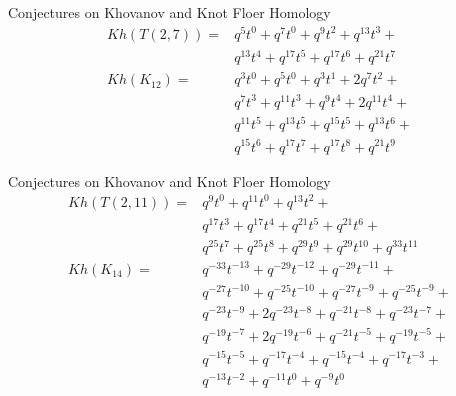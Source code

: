 \documentclass{beamer}
\begin{document}
    \begin{frame}{Conjectures on Khovanov and Knot Floer Homology}
        \begin{align}
            Kh(T(2,7))=&q^{5}t^{0}+q^{7}t^{0}+q^{9}t^{2}+q^{13}t^{3}+\nonumber\\
                &q^{13}t^{4}+q^{17}t^{5}+q^{17}t^{6}+q^{21}t^{7}\\
            Kh(K_{12})=&q^{3}t^{0}+q^{5}t^{0}+q^{3}t^{1}+2q^{7}t^{2}+\nonumber\\
                &q^{7}t^{3}+q^{11}t^{3}+q^{9}t^{4}+2q^{11}t^{4}+\nonumber\\
                &q^{11}t^{5}+q^{13}t^{5}+q^{15}t^{5}+q^{13}t^{6}+\nonumber\\
                &q^{15}t^{6}+q^{17}t^{7}+q^{17}t^{8}+q^{21}t^{9}
        \end{align}
    \end{frame}
    \begin{frame}{Conjectures on Khovanov and Knot Floer Homology}
        \begin{align}
            Kh(T(2,11))=&q^{9}t^{0}+q^{11}t^{0}+q^{13}t^{2}+\nonumber\\
                &q^{17}t^{3}+q^{17}t^{4}+q^{21}t^{5}+q^{21}t^{6}+\nonumber\\
                &q^{25}t^{7}+q^{25}t^{8}+q^{29}t^{9}+q^{29}t^{10}+q^{33}t^{11}\\
            Kh(K_{14})=&q^{-33}t^{-13}+q^{-29}t^{-12}+q^{-29}t^{-11}+\nonumber\\
                &q^{-27}t^{-10}+q^{-25}t^{-10}+q^{-27}t^{-9}+q^{-25}t^{-9}+\nonumber\\
                &q^{-23}t^{-9}+2q^{-23}t^{-8}+q^{-21}t^{-8}+q^{-23}t^{-7}+\nonumber\\
                &q^{-19}t^{-7}+2q^{-19}t^{-6}+q^{-21}t^{-5}+q^{-19}t^{-5}+\nonumber\\
                &q^{-15}t^{-5}+q^{-17}t^{-4}+q^{-15}t^{-4}+q^{-17}t^{-3}+\nonumber\\
                &q^{-13}t^{-2}+q^{-11}t^{0}+q^{-9}t^{0}
        \end{align}
    \end{frame}
\end{document}
